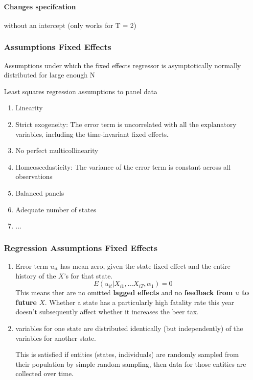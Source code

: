 \documentclass[a3paper, 8pt]{extarticle}
\begin{document}
\begin{multicols*}{5}
\paragraph{Changes specifcation} without an intercept (only works for T = 2)



\subsubsection{Assumptions Fixed Effects}
Assumptions under which the fixed effects regressor is asymptotically normally distributed for large enough N

Least squares regression assumptions to panel data
\begin{enumerate}
    \item Linearity
    \item Strict exogeneity: The error term is uncorrelated with all the explanatory variables, including the time-invariant fixed effects.
    \item No perfect multicollinearity
    \item Homeoscedasticity: The variance of the error term is constant across all observations
    \item Balanced panels
    \item Adequate number of states
    \item ...
\end{enumerate}

\subsubsection{Regression Assumptions Fixed Effects}


\begin{enumerate}
    \item Error term $u_{it}$ has mean zero, given the state fixed effect and the entire history of the $X$'s for that state.
    $$E(u_{it} | X_{i1}, ... X_{iT}, \alpha_1)=0$$
    This means ther are no omitted  \textbf{lagged effects}
    and no \textbf{feedback from $u$ to future $X$}. Whether a state has a particularly high fatality rate this year doesn't subsequently affect whether it increases the beer tax.
    \item variables for one state are distributed identically (but independently) of the variables for another state.

    This is satisfied if entities (states, individuals) are randomly sampled from their population by simple random sampling, then data for those entities are collected over time.


\end{enumerate}
\end{multicols*}
\end{document}
